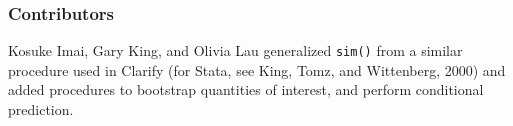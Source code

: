 \subsubsection{Contributors}

Kosuke Imai, Gary King, and Olivia Lau generalized {\tt sim()} from a
similar procedure used in Clarify (for Stata, see King, Tomz, and
Wittenberg, 2000) and added procedures to bootstrap quantities of
interest, and perform conditional prediction.  














